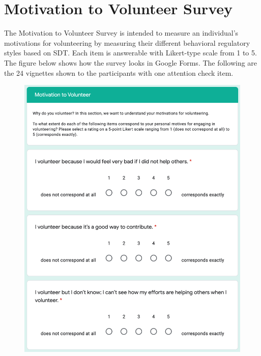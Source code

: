 \section{Motivation to Volunteer Survey}
The Motivation to Volunteer Survey is intended to measure an individual's motivations for volunteering by measuring their different behavioral regulatory styles based on SDT. Each item is answerable with Likert-type scale from 1 to 5. The figure below shows how the survey looks in Google Forms. The following are the 24 vignettes shown to the participants with one attention check item.
\begin{figure}[h]
  \centering
  \includegraphics[scale=0.6]{figures/d-mvs.png}
\end{figure}

